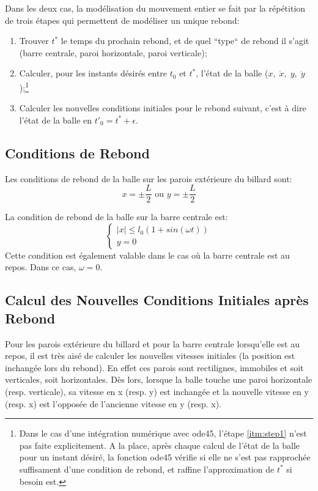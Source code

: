 \documentclass[a4paper]{report}
\begin{document}
Dans les deux cas, la modélisation du mouvement entier se fait par la répétition de trois étapes qui permettent de modéliser un unique rebond:
\begin{enumerate}
 \item Trouver \(t^*\) le temps du prochain rebond, et de quel ``type`` de rebond il s'agit (barre centrale, paroi horizontale, paroi verticale)\label{itm:step1};
 \item Calculer, pour les instants désirés entre \(t_0\) et \(t^*\), l'état de la balle (\(x, \; \dot{x}, \; y, \; \dot{y} \));\footnote{Dans le cas d'une intégration numérique avec ode45, l'étape \ref{itm:step1} n'est pas faite explicitement. A la place, après chaque calcul de l'état de la balle pour un instant désiré, la fonction ode45 vérifie si elle ne s'est pas rapprochée suffisament d'une condition de rebond, et raffine l'approximation de \(t^*\) si besoin est.}
 \item Calculer les nouvelles conditions initiales pour le rebond suivant, c'est à dire l'état de la balle en \(t'_0=t^*+\epsilon\).
\end{enumerate}
\subsection{Conditions de Rebond}
Les conditions de rebond de la balle sur les parois extérieure du billard sont:
\begin{equation*}
 x=\pm \frac{L}{2} \text{ ou } y=\pm \frac{L}{2}
\end{equation*}

La condition de rebond de la balle sur la barre centrale est:
\begin{equation}
\label{eqn:rebCentr}
\begin{cases}
\lvert x \rvert \leq l_0(1+sin(\omega t))\\
y=0
\end{cases}
\end{equation}
Cette condition est également valable dans le cas où la barre centrale est au repos. Dans ce cas, \(\omega=0\).
\subsection{Calcul des Nouvelles Conditions Initiales après Rebond}
\label{sec:reb}
Pour les parois extérieure du billard et pour la barre centrale lorsqu'elle est au repos, il est très aisé de calculer les nouvelles vitesses initiales (la position est inchangée lors du rebond). En effet ces parois sont rectilignes, immobiles et soit verticales, soit horizontales. Dès lors, lorsque la balle touche une paroi horizontale (resp. verticale), sa vitesse en x (resp. y) est inchangée et la nouvelle vitesse en y (resp. x) est l'opposée de l'ancienne vitesse en y (resp. x).
\end{document}
